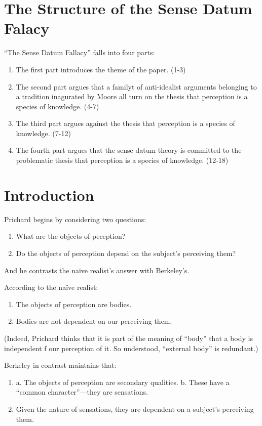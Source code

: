 \documentclass[11pt]{article}
\begin{document}
\section{The Structure of the Sense Datum Falacy} %
\label{sec:the_structure_of_the_sense_datum_falacy}
``The Sense Datum Fallacy'' falls into four parts:
\begin{enumerate}
    \item The first part introduces the theme of the paper. (1-3)
    \item The second part argues that a familyt of anti-idealist arguments belonging to a tradition inagurated by Moore all turn on the thesis that perception is a species of knowledge. (4-7)
    \item The third part argues against the thesis that perception is a species of knowledge. (7-12)
    \item The fourth part argues that the sense datum theory is committed to the problematic thesis that perception is a species of knowledge. (12-18)
\end{enumerate}

\section{Introduction} %
\label{sec:introduction}
Prichard begins by considering two questions:
\begin{enumerate}
    \item What are the objects of peception?
    \item Do the objects of perception depend on the subject's perceiving them?
\end{enumerate}
And he contrasts the naïve realist's answer with Berkeley's.

According to the naïve realist:
\begin{enumerate}
    \item The objects of perception are bodies.
    \item Bodies are not dependent on our perceiving them.
\end{enumerate}
(Indeed, Prichard thinks that it is part of the meaning of ``body'' that a body is independent f our perception of it. So understood, ``external body'' is redundant.)

Berkeley in contrast maintains that:
\begin{enumerate}
    \item a. The objects of perception are secondary qualities. b. These have a ``common character''---they are sensations.
    \item Given the nature of sensations, they are dependent on a subject's perceiving them.
\end{enumerate}
\end{document}
